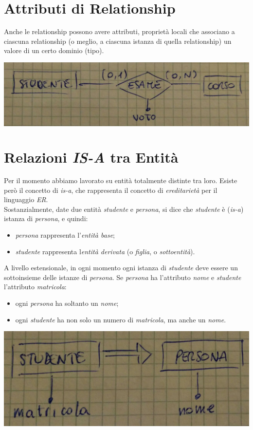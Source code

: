 \section{Attributi di Relationship}
Anche le relationship possono avere attributi, proprietà locali che associano a ciascuna relationship (o meglio, a ciascuna istanza di quella relationship) un valore di un certo dominio (tipo).
\begin{center}
    \includegraphics[width=.7\textwidth]{res/er-studente-corso.jpg} \hfill
\end{center}

\section{Relazioni \textit{IS-A} tra Entità}
Per il momento abbiamo lavorato su entità totalmente distinte tra loro. Esiste però il concetto di \textit{is-a}, che rappresenta il concetto di \textit{ereditarietà} per il linguaggio \textit{ER}. \\
Sostanzialmente, date due entità \textit{studente} e \textit{persona}, si dice che \textit{studente} è (\textit{is-a}) istanza di \textit{persona}, e quindi:
\begin{itemize}
    \item \textit{persona} rappresenta l'\textit{entità base};
    \item \textit{studente} rappresenta l\textit{entità derivata} (o \textit{figlia}, o \textit{sottoentità}).
\end{itemize}
A livello estensionale, in ogni momento ogni istanza di \textit{studente} deve essere un sottoinsieme delle istanze di \textit{persona}.
Se \textit{persona} ha l'attributo \textit{nome} e \textit{studente} l'attributo \textit{matricola}:
\begin{itemize}
    \item ogni \textit{persona} ha soltanto un \textit{nome};
    \item ogni \textit{studente} ha non solo un numero di \textit{matricola}, ma anche un \textit{nome}.
\end{itemize}
\begin{center}
    \includegraphics[width=.7\textwidth]{res/er-studente-persona.jpg} \hfill
\end{center}

